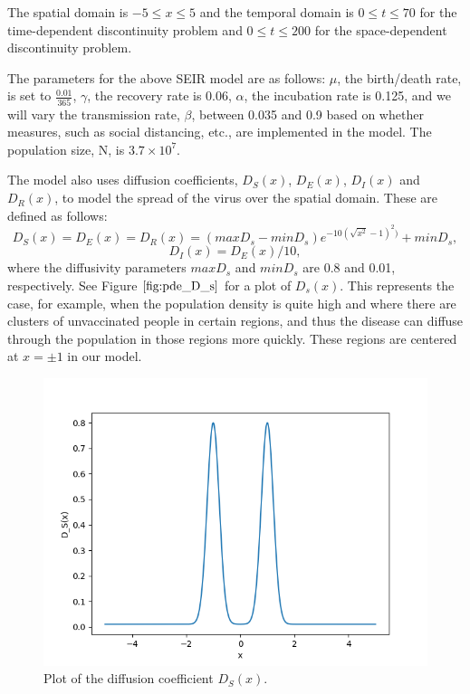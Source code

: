 The spatial domain is $-5 \leq x \leq 5$ and the temporal domain is $0 \leq t \leq 70$ for the time-dependent discontinuity problem and $0 \leq t \leq 200$ for the space-dependent discontinuity problem.

The parameters for the above SEIR model are as follows: $\mu$, the birth/death rate, is set to $\frac{0.01}{365}$, $\gamma$, the recovery rate is 0.06, $\alpha$, the incubation rate is 0.125, and we will vary the transmission rate, $\beta$, between 0.035 and 0.9 based on whether measures, such as social distancing, etc., are implemented in the model. The population size, N, is $3.7 \times 10^{7}$.

The model also uses diffusion coefficients,  $D_S(x)$, $D_E(x)$, $D_I(x)$ and $D_R(x)$, to model the spread of the virus over the spatial domain. These are defined as follows:
\begin{equation}
D_S(x) = D_E(x) = D_R(x) = (maxD_s - minD_s)e^{-10(\sqrt{x^{2}} - 1)^2)} + minD_s,
\end{equation} 
\begin{equation}
D_I(x) = D_E(x)/10,
\end{equation}
where the diffusivity parameters $maxD_s$ and $minD_s$ are 0.8 and 0.01, respectively. See Figure $\ref{fig:pde_D_s}$ for a plot of $D_s(x)$. This represents the case, for example, when the population density is quite high and where there are clusters of unvaccinated people in certain regions, and thus the disease can diffuse through the population in those regions more quickly. These regions are centered at $x= \pm 1$ in our model.

\begin{figure}[H]
\centering
\includegraphics[width=0.7\linewidth]{./figures/pde_D_s}
\caption{Plot of the diffusion coefficient $D_S(x)$.}
\label{fig:pde_D_s}
\end{figure}

